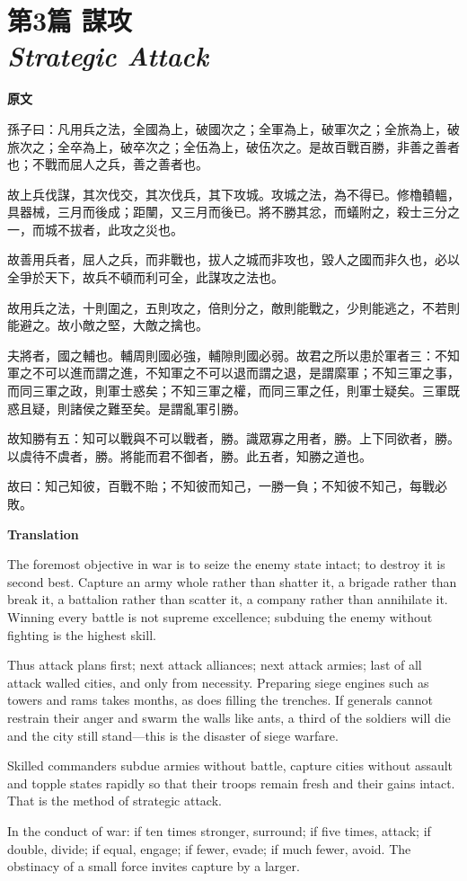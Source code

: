 \documentclass[12pt]{book}
\newcommand{\chapterentry}[4]{%
  \chapter[\texorpdfstring{#1}{#1}]{\texorpdfstring{#1\\\Large\textit{#2}}{#1 — #2}}%
  \noindent\textbf{原文}\par
  #3

  \bigskip
  \noindent\textbf{Translation}\par
  #4
}
\begin{document}
\chapterentry{第3篇 謀攻}{Strategic Attack}{%
孫子曰：凡用兵之法，全國為上，破國次之；全軍為上，破軍次之；全旅為上，破旅次之；全卒為上，破卒次之；全伍為上，破伍次之。是故百戰百勝，非善之善者也；不戰而屈人之兵，善之善者也。

故上兵伐謀，其次伐交，其次伐兵，其下攻城。攻城之法，為不得已。修櫓轒轀，具器械，三月而後成；距闉，又三月而後已。將不勝其忿，而蟻附之，殺士三分之一，而城不拔者，此攻之災也。

故善用兵者，屈人之兵，而非戰也，拔人之城而非攻也，毀人之國而非久也，必以全爭於天下，故兵不頓而利可全，此謀攻之法也。

故用兵之法，十則圍之，五則攻之，倍則分之，敵則能戰之，少則能逃之，不若則能避之。故小敵之堅，大敵之擒也。

夫將者，國之輔也。輔周則國必強，輔隙則國必弱。故君之所以患於軍者三：不知軍之不可以進而謂之進，不知軍之不可以退而謂之退，是謂縻軍；不知三軍之事，而同三軍之政，則軍士惑矣；不知三軍之權，而同三軍之任，則軍士疑矣。三軍既惑且疑，則諸侯之難至矣。是謂亂軍引勝。

故知勝有五：知可以戰與不可以戰者，勝。識眾寡之用者，勝。上下同欲者，勝。以虞待不虞者，勝。將能而君不御者，勝。此五者，知勝之道也。

故曰：知己知彼，百戰不貽；不知彼而知己，一勝一負；不知彼不知己，每戰必敗。}{%
The foremost objective in war is to seize the enemy state intact; to destroy it is second best. Capture an army whole rather than shatter it, a brigade rather than break it, a battalion rather than scatter it, a company rather than annihilate it. Winning every battle is not supreme excellence; subduing the enemy without fighting is the highest skill.

Thus attack plans first; next attack alliances; next attack armies; last of all attack walled cities, and only from necessity. Preparing siege engines such as towers and rams takes months, as does filling the trenches. If generals cannot restrain their anger and swarm the walls like ants, a third of the soldiers will die and the city still stand—this is the disaster of siege warfare.

Skilled commanders subdue armies without battle, capture cities without assault and topple states rapidly so that their troops remain fresh and their gains intact. That is the method of strategic attack.

In the conduct of war: if ten times stronger, surround; if five times, attack; if double, divide; if equal, engage; if fewer, evade; if much fewer, avoid. The obstinacy of a small force invites capture by a larger.

}
\end{document}
